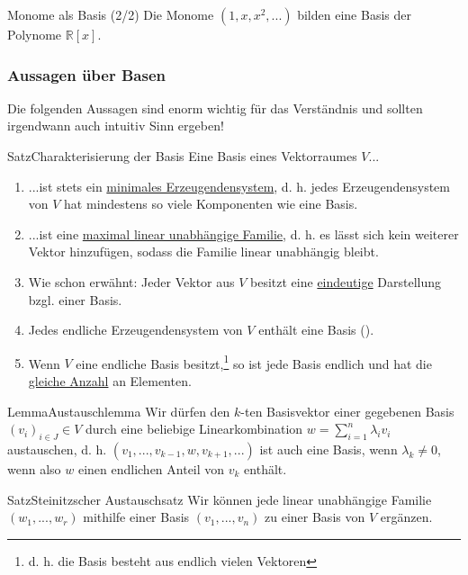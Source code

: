 \begin{Beispiel}
{Monome als Basis (2/2)}
Die Monome $(1,x,x^2,...)$ bilden eine Basis der Polynome $\mathbb{R}[x]$.
\end{Beispiel}
\subsubsection{Aussagen über Basen}
Die folgenden Aussagen sind enorm wichtig für das Verständnis und sollten irgendwann auch intuitiv Sinn ergeben!
\begin{Satz}
{Satz}{Charakterisierung der Basis}
Eine Basis eines Vektorraumes $V$...
\begin{enumerate}
    \item ...ist stets ein \underline{minimales Erzeugendensystem}, d. h. jedes Erzeugendensystem von $V$ hat mindestens so viele Komponenten wie eine Basis.
    \item ...ist eine \underline{maximal linear unabhängige Familie}, d. h. es lässt sich kein weiterer Vektor hinzufügen, sodass die Familie linear unabhängig bleibt.
    \item Wie schon erwähnt: Jeder Vektor aus $V$ besitzt eine \underline{eindeutige} Darstellung bzgl. einer Basis.
    \item Jedes endliche Erzeugendensystem von $V$ enthält eine Basis ().
    \item Wenn $V$ eine endliche Basis besitzt,\footnote{d. h. die Basis besteht aus endlich vielen Vektoren} so ist jede Basis endlich und hat die \underline{gleiche Anzahl} an Elementen.
\end{enumerate}
\end{Satz}
\begin{Satz}
{Lemma}{Austauschlemma}
Wir dürfen den $k$-ten Basisvektor einer gegebenen Basis $(v_i)_{i\in J}\in V$ durch eine beliebige Linearkombination $w=\sum_{i=1}^n\lambda_iv_i$ austauschen, d. h. $(v_1,...,v_{k-1},w,v_{k+1},...)$ ist auch eine Basis, wenn $\lambda_k\neq 0$, wenn also $w$ einen endlichen Anteil von $v_k$ enthält.
\end{Satz}
\begin{Satz}
{Satz}{Steinitzscher Austauschsatz}
Wir können jede linear unabhängige Familie $(w_1,...,w_r)$ mithilfe einer Basis $(v_1,...,v_n)$ zu einer Basis von $V$ ergänzen.
\end{Satz}

